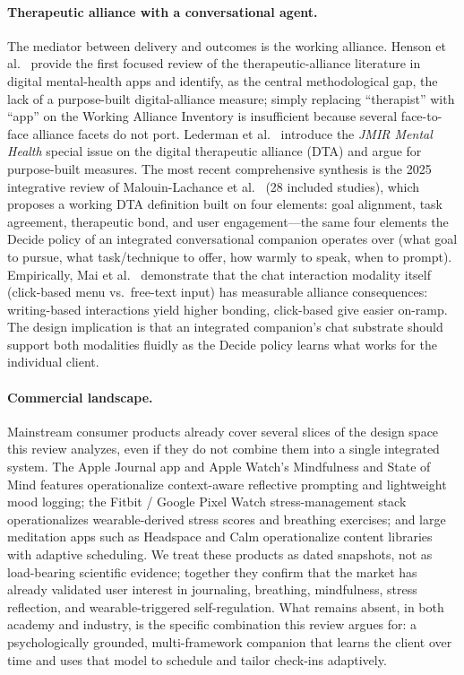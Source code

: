 \documentclass[11pt,a4paper]{article}
\begin{document}
\paragraph{Therapeutic alliance with a conversational agent.}
The mediator between delivery and outcomes is the working
alliance. Henson et al.~\cite{Henson2019DTA} provide the first
focused review of the therapeutic-alliance literature in digital
mental-health apps and identify, as the central methodological
gap, the lack of a purpose-built digital-alliance measure; simply
replacing ``therapist'' with ``app'' on the Working Alliance
Inventory is insufficient because several face-to-face alliance
facets do not port. Lederman et al.~\cite{Lederman2021DTASpecialIssue}
introduce the \emph{JMIR Mental Health} special issue on the
digital therapeutic alliance (DTA) and argue for purpose-built
measures. The most recent comprehensive synthesis is the 2025
integrative review of Malouin-Lachance et
al.~\cite{MalouinLachance2025DTAReview} (28 included studies),
which proposes a working DTA definition built on four elements:
goal alignment, task agreement, therapeutic bond, and user
engagement---the same four elements the Decide policy of an
integrated conversational companion operates over (what goal to
pursue, what task/technique to offer, how warmly to speak, when to
prompt). Empirically, Mai et al.~\cite{Mai2022CoachbotInteraction}
demonstrate that the chat interaction modality itself (click-based
menu vs.\ free-text input) has measurable alliance consequences:
writing-based interactions yield higher bonding, click-based give
easier on-ramp. The design implication is that an integrated
companion's chat substrate should support both modalities fluidly
as the Decide policy learns what works for the individual client.

\paragraph{Commercial landscape.}
Mainstream consumer products already cover several slices of the
design space this review analyzes, even if they do not combine
them into a single integrated system. The Apple Journal app and
Apple Watch's Mindfulness and State of Mind features operationalize
context-aware reflective prompting and lightweight mood logging;
the Fitbit / Google Pixel Watch stress-management stack
operationalizes wearable-derived stress scores and breathing
exercises; and large meditation apps such as Headspace and Calm
operationalize content libraries with adaptive scheduling. We
treat these products as dated snapshots, not as load-bearing
scientific evidence; together they confirm that the market has
already validated user interest in journaling, breathing,
mindfulness, stress reflection, and wearable-triggered
self-regulation. What remains absent, in both academy and
industry, is the specific combination this review argues for: a
psychologically grounded, multi-framework companion that learns
the client over time and uses that model to schedule and tailor
check-ins adaptively.
\end{document}
